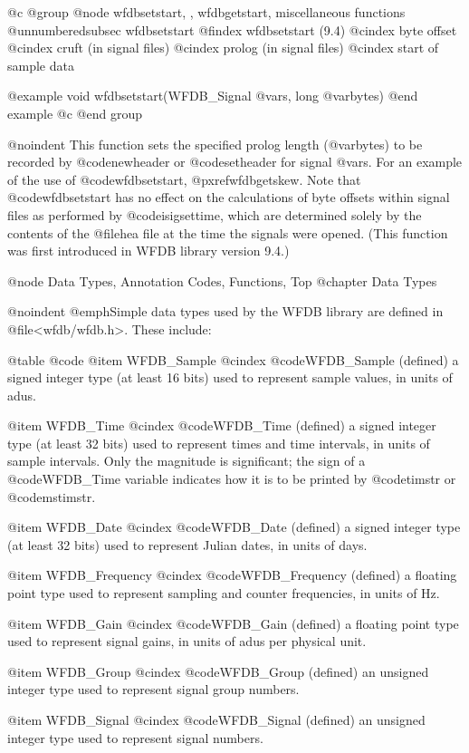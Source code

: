 {{{{{{{{{{@c @group
@node     wfdbsetstart, , wfdbgetstart, miscellaneous functions
@unnumberedsubsec wfdbsetstart
@findex wfdbsetstart (9.4)
@cindex byte offset
@cindex cruft (in signal files)
@cindex prolog (in signal files)
@cindex start of sample data

@example
void wfdbsetstart(WFDB_Signal @var{s}, long @var{bytes})
@end example
@c @end group

@noindent
This function sets the specified prolog length (@var{bytes}) to be
recorded by @code{newheader} or @code{setheader} for signal @var{s}.
For an example of the use of @code{wfdbsetstart}, @pxref{wfdbgetskew}.  Note
that @code{wfdbsetstart} has no effect on the calculations of byte offsets
within signal files as performed by @code{isigsettime}, which are
determined solely by the contents of the @file{hea} file at the time
the signals were opened.  (This function was first introduced in WFDB library
version 9.4.)


@node     Data Types, Annotation Codes, Functions, Top
@chapter Data Types

@noindent
@emph{Simple data types} used by the WFDB library are defined in
@file{<wfdb/wfdb.h>}.  These include:

@table @code
@item WFDB_Sample
@cindex @code{WFDB_Sample} (defined)
a signed integer type (at least 16 bits) used to represent sample
values, in units of adus.

@item WFDB_Time
@cindex @code{WFDB_Time} (defined)
a signed integer type (at least 32 bits) used to represent times and
time intervals, in units of sample intervals.  Only the magnitude is
significant;  the sign of a @code{WFDB_Time} variable indicates how it
is to be printed by @code{timstr} or @code{mstimstr}.

@item WFDB_Date
@cindex @code{WFDB_Date} (defined)
a signed integer type (at least 32 bits) used to represent Julian dates,
in units of days.

@item WFDB_Frequency
@cindex @code{WFDB_Frequency} (defined)
a floating point type used to represent sampling and counter
frequencies, in units of Hz.

@item WFDB_Gain
@cindex @code{WFDB_Gain} (defined)
a floating point type used to represent signal gains, in units of adus
per physical unit.

@item WFDB_Group
@cindex @code{WFDB_Group} (defined)
an unsigned integer type used to represent signal group numbers.

@item WFDB_Signal
@cindex @code{WFDB_Signal} (defined)
an unsigned integer type used to represent signal numbers.

}}}}}}}}}}
